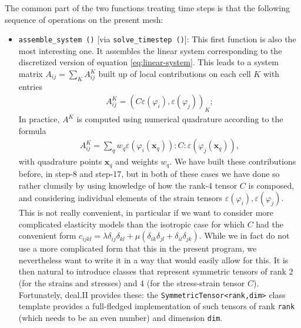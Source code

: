 \documentclass{article}
\renewcommand{\vec}[1]{\mathbf{#1}}
\begin{document}
The common part of the two functions treating time steps is that the following
sequence of operations on the present mesh:
\begin{itemize}
\item \texttt{assemble\_system ()} [via \texttt{solve\_timestep ()}]:
  This first function is also the most interesting one. It assembles the
  linear system corresponding to the discretized version of equation
  \eqref{eq:linear-system}. This leads to a system matrix $A_{ij} = \sum_K
  A^K_{ij}$ built up of local contributions on each cell $K$ with entries
  \begin{gather}
    A^K_{ij} = (C \varepsilon(\varphi_i), \varepsilon(\varphi_j))_K;
  \end{gather}
  In practice, $A^K$ is computed using numerical quadrature according to the
  formula
  \begin{gather}
    A^K_{ij} = \sum_q w_q  \varepsilon(\varphi_i(\vec x_q)) : C :
                           \varepsilon(\varphi_j(\vec x_q)),
  \end{gather}
  with quadrature points $\vec x_q$ and weights $w_q$. We have built these
  contributions before, in step-8 and step-17, but in both of these cases we
  have done so rather clumsily by using knowledge of how the rank-4 tensor $C$
  is composed, and considering individual elements of the strain tensors
  $\varepsilon(\varphi_i),\varepsilon(\varphi_j)$. This is not really
  convenient, in particular if we want to consider more complicated elasticity
  models than the isotropic case for which $C$ had the convenient form
  $c_{ijkl}  = \lambda \delta_{ij} \delta_{kl} + \mu (\delta_{ik} \delta_{jl}
  + \delta_{il} \delta_{jk})$. While we in fact do not use a more complicated
  form that this in the present program, we nevertheless want to write it in a
  way that would easily allow for this. It is then natural to introduce
  classes that represent symmetric tensors of rank 2 (for the strains and
  stresses) and 4 (for the stress-strain tensor $C$). Fortunately, deal.II
  provides these: the \texttt{SymmetricTensor<rank,dim>} class template
  provides a full-fledged implementation of such tensors of rank \texttt{rank}
  (which needs to be an even number) and dimension \texttt{dim}.


\end{itemize}
\end{document}
